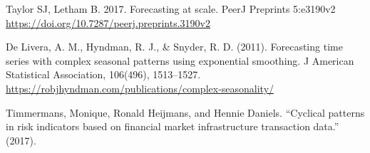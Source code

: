 Taylor SJ, Letham B. 2017. Forecasting at scale. PeerJ Preprints
5:e3190v2 \url{https://doi.org/10.7287/peerj.preprints.3190v2}

De Livera, A. M., Hyndman, R. J., \& Snyder, R. D. (2011). Forecasting
time series with complex seasonal patterns using exponential smoothing.
J American Statistical Association, 106(496), 1513--1527.
\url{https://robjhyndman.com/publications/complex-seasonality/}

Timmermans, Monique, Ronald Heijmans, and Hennie Daniels. ``Cyclical
patterns in risk indicators based on financial market infrastructure
transaction data.'' (2017).



\address{%
Christoph Sax\\
University of Base\\%
line 1\\ line 2\\
%
\url{https://journal.r-project.org}%
\\\textit{ORCiD: \href{https://orcid.org/0000-0002-9079-593X}{0000-0002-9079-593X}}%
\\\href{mailto:author1@work}{\nolinkurl{author1@work}}
}

\address{%
Author Two\\
Affiliation 1\\%
line 1 affiliation 1\\ line 2 affiliation 1\\
Affiliation 2\\%
line 1 affiliation 2\\ line 2 affiliation 2\\
%
\url{https://journal.r-project.org}%
\\\textit{ORCiD: \href{https://orcid.org/0000-0002-9079-593X}{0000-0002-9079-593X}}%
\\\href{mailto:author2@work}{\nolinkurl{author2@work}}
}

\address{%
Author Three\\
Affiliation\\%
line 1 affiliation\\ line 2 affiliation\\
%
\url{https://journal.r-project.org}%
%
\\\href{mailto:author3@work}{\nolinkurl{author3@work}}
}

